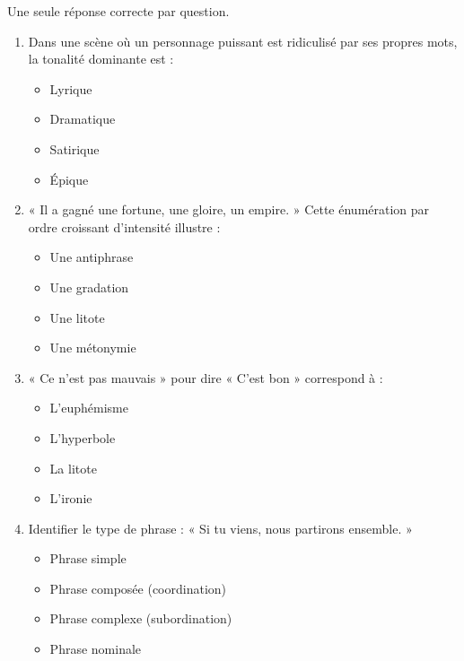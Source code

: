 \documentclass[11pt]{article}
\begin{document}
\begin{exercice}
Une seule réponse correcte par question.
\begin{enumerate}
    \item Dans une scène où un personnage puissant est ridiculisé par ses propres mots, la tonalité dominante est :
    \begin{itemize}
        \item[$\square$] Lyrique \item[$\square$] Dramatique \item[$\square$] Satirique \item[$\square$] Épique
    \end{itemize}
    \item « Il a gagné une fortune, une gloire, un empire. » Cette énumération par ordre croissant d'intensité illustre :
    \begin{itemize}
        \item[$\square$] Une antiphrase \item[$\square$] Une gradation \item[$\square$] Une litote \item[$\square$] Une métonymie
    \end{itemize}
    \item « Ce n'est pas mauvais » pour dire « C'est bon » correspond à :
    \begin{itemize}
        \item[$\square$] L'euphémisme \item[$\square$] L'hyperbole \item[$\square$] La litote \item[$\square$] L'ironie
    \end{itemize}
    \item Identifier le type de phrase : « Si tu viens, nous partirons ensemble. »
    \begin{itemize}
        \item[$\square$] Phrase simple \item[$\square$] Phrase composée (coordination) \item[$\square$] Phrase complexe (subordination) \item[$\square$] Phrase nominale
    \end{itemize}
\end{enumerate}
\end{exercice}
\end{document}
